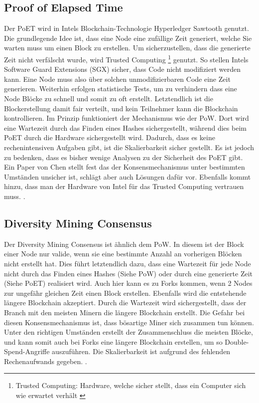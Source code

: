 \subsection{Proof of Elapsed Time}
Der PoET wird in Intels Blockchain-Technologie Hyperledger Sawtooth genutzt. Die grundlegende Idee ist, dass eine Node eine zufällige Zeit generiert, welche Sie warten muss um einen Block zu erstellen. Um sicherzustellen, dass die generierte Zeit nicht verfälscht wurde, wird Trusted Computing \footnote{Trusted Computing: Hardware, welche sicher stellt, dass ein Computer sich wie erwartet verhält \cite{MitchellTrustedComputing2005}} genutzt. So stellen Intels Software Guard Extensions (SGX) sicher, dass Code nicht modifiziert werden kann. Eine Node muss also über solchen unmodifizierbaren Code eine Zeit generieren. Weiterhin erfolgen statistische Tests, um zu verhindern dass eine Node Blöcke zu schnell und somit zu oft erstellt. Letztendlich ist die Blockerstellung damit fair verteilt, und kein Teilnehmer kann die Blockchain kontrollieren. Im Prinzip funktioniert der Mechanismus wie der PoW. Dort wird eine Wartezeit durch das Finden eines Hashes sichergestellt, während dies beim PoET durch die Hardware sichergestellt wird. Dadurch, dass es keine rechenintensiven Aufgaben gibt, ist die Skalierbarkeit sicher gestellt. Es ist jedoch zu bedenken, dass es bisher wenige Analysen zu der Sicherheit des PoET gibt. Ein Paper von Chen stellt fest das der Konsensmechanismus unter bestimmten Umständen unsicher ist, schlägt aber auch Lösungen dafür vor. Ebenfalls kommt hinzu, dass man der Hardware von Intel für das Trusted Computing vertrauen muss. \cite{ChenSecurityAnalysisProofofElapsedTime2017}.

\subsection{Diversity Mining Consensus}
Der Diversity Mining Consensus ist ähnlich dem PoW. In diesem ist der Block einer Node nur valide, wenn sie eine bestimmte Anzahl an vorherigen Blöcken nicht erstellt hat. Dies führt letztendlich dazu, dass eine Wartezeit für jede Node nicht durch das Finden eines Hashes (Siehe PoW) oder durch eine generierte Zeit (Siehe PoET) realisiert wird. Auch hier kann es zu Forks kommen, wenn 2 Nodes zur ungefähr gleichen Zeit einen Block erstellen. Ebenfalls wird die entstehende längere Blockchain akzeptiert. Durch die Wartezeit wird sichergestellt, dass der Branch mit den meisten Minern die längere Blockchain erstellt. Die Gefahr bei diesen Konsensmechanismus ist, dass bösartige Miner sich zusammen tun können. Unter den richtigen Umständen erstellt der Zusammenschluss die meisten Blöcke, und kann somit auch bei Forks eine längere Blockchain erstellen, um so Double-Spend-Angriffe auszuführen. Die Skalierbarkeit ist aufgrund des fehlenden Rechenaufwands gegeben. \cite{GreenspanMultiChainPrivateBlockchain2015}\cite{CachinBlockchainConsensusProtocols2017}.


